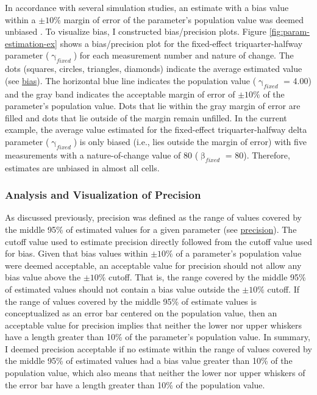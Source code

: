 \documentclass[
12pt, %
twoside,
english]{guelphthesis}
\begin{document}
In accordance with several simulation studies, an estimate with a bias value within a \(\pm10\%\) margin of error of the parameter's population value was deemed unbiased \autocite{muthen1997}. To visualize bias, I constructed bias/precision plots. Figure \ref{fig:param-estimation-ex} shows a bias/precision plot for the fixed-effect triquarter-halfway parameter (\(\upgamma_{fixed}\)) for each measurement number and nature of change. The dots (squares, circles, triangles, diamonds) indicate the average estimated value (see \protect\hyperlink{bias-comp}{bias}). The horizontal blue line indicates the population value (\(\upgamma_{fixed}\) = 4.00) and the gray band indicates the acceptable margin of error of \(\pm10\%\) of the parameter's population value. Dots that lie within the gray margin of error are filled and dots that lie outside of the margin remain unfilled. In the current example, the average value estimated for the fixed-effect triquarter-halfway delta parameter (\(\upgamma_{fixed}\)) is only biased (i.e., lies outside the margin of error) with five measurements with a nature-of-change value of 80 (\(\upbeta_{fixed}\) = 80). Therefore, estimates are unbiased in almost all cells.

\hypertarget{precision-analysis}{%
\subsubsection{Analysis and Visualization of Precision}\label{precision-analysis}}

As discussed previously, precision was defined as the range of values covered by the middle 95\% of estimated values for a given parameter (see \protect\hyperlink{precision-mid-ext-exp1}{precision}). The cutoff value used to estimate precision directly followed from the cutoff value used for bias. Given that bias values within \(\pm10\%\) of a parameter's population value were deemed acceptable, an acceptable value for precision should not allow any bias value above the \(\pm10\%\) cutoff. That is, the range covered by the middle 95\% of estimated values should not contain a bias value outside the \(\pm10\%\) cutoff. If the range of values covered by the middle 95\% of estimate values is conceptualized as an error bar centered on the population value, then an acceptable value for precision implies that neither the lower nor upper whiskers have a length greater than 10\% of the parameter's population value. In summary, I deemed precision acceptable if no estimate within the range of values covered by the middle 95\% of estimated values had a bias value greater than 10\% of the population value, which also means that neither the lower nor upper whiskers of the error bar have a length greater than 10\% of the population value.
\end{document}
